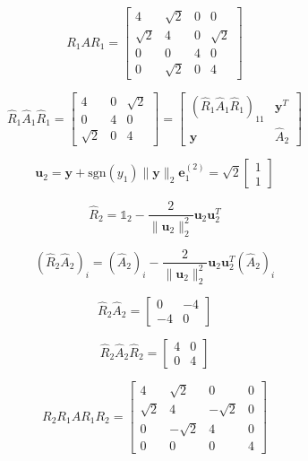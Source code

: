 \documentclass[a4paper,11pt]{article}
\begin{document}
\begin{equation}\label{key}
		R_1 A R_1 = \left[ \begin{array}{cccc}
		4 & \sqrt{2} & 0 & 0 \\
		\sqrt{2} & 4 & 0 & \sqrt{2} \\
		0 & 0 & 4 & 0 \\
		0 & \sqrt{2} & 0 & 4
	\end{array} \right]  
\end{equation}

\begin{equation}\label{key}
	\hat{R}_1 \hat{A}_1 \hat{R}_1 = \left[ \begin{array}{ccc}
		4 & 0 & \sqrt{2} \\
		0 & 4 & 0 \\
		\sqrt{2} & 0 & 4
	\end{array} \right]  =  \left[ \begin{array}{cc}
	(\hat{R}_1 \hat{A}_1 \hat{R}_1)_{11}& \textbf{y}^T \\
	\textbf{y} & \hat{A}_2 
\end{array} \right]
\end{equation}	
	
\begin{equation}\label{key}
	\textbf{u}_2 = \textbf{y} + \text{sgn}(y_1) \lVert \textbf{y}\rVert_2\textbf{e}_1^{(2)} = \sqrt{2} \begin{bmatrix}
		1\\
		1
	\end{bmatrix}
\end{equation}	
	
	
\begin{equation}\label{key}
	\hat{R}_2 = \mathbb{1}_2 - \frac{2}{\lVert \textbf{u}_2\rVert_2^2} \textbf{u}_2 \textbf{u}_2^T
\end{equation}
	
\begin{equation}\label{key}
	( \hat{R}_2\hat{A}_2)_i = (\hat{A}_2)_i - \frac{2}{\lVert \textbf{u}_2\rVert_2^2} \textbf{u}_2 \textbf{u}_2^T(\hat{A}_2)_i
\end{equation}
	
\begin{equation}\label{key}
	\hat{R}_2 \hat{A}_2 = \left[ \begin{array}{cc}
		0 & -4 \\
		-4 & 0
	\end{array}\right] 
\end{equation}
	
\begin{equation}\label{key}
	\hat{R}_2 \hat{A}_2 \hat{R}_2  = \left[ \begin{array}{cc}
		4 & 0 \\
		0 &4
	\end{array}\right] 
\end{equation}

\begin{equation}\label{key}
	R_2R_1AR_1R_2 =\begin{bmatrix}
		4& \sqrt{2} & 0  &  0\\
		\sqrt{2}&4 & -\sqrt{2} & 0\\
		0 & -\sqrt{2} & 4  & 0 \\
		0 & 0 & 0 & 4
	\end{bmatrix}
\end{equation}
\end{document}

